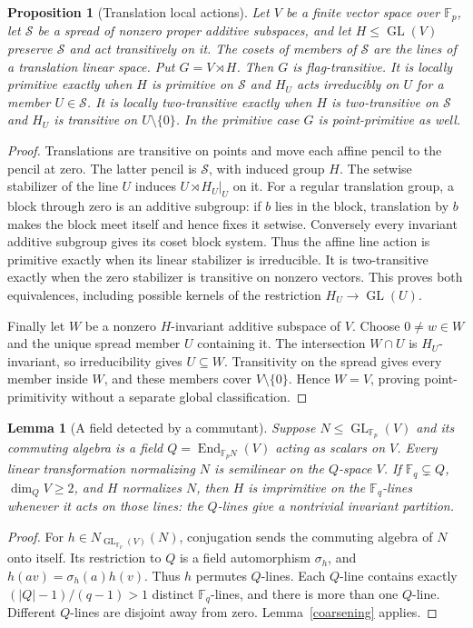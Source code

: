 \documentclass[11pt,a4paper]{article}
\newtheorem{lemma}[theorem]{Lemma}
\newtheorem{proposition}[theorem]{Proposition}
\newcommand{\F}{\mathbb F}
\newcommand{\GL}{\operatorname{GL}}
\newcommand{\End}{\operatorname{End}}
\begin{document}
\begin{proposition}[Translation local actions]\label{translation}
Let $V$ be a finite vector space over $\F_p$, let $\mathcal S$ be a spread
of nonzero proper additive subspaces, and let $H\leq\GL(V)$ preserve
$\mathcal S$ and act transitively on it. The cosets of members of
$\mathcal S$ are the lines of a translation linear space. Put $G=V\rtimes H$.
Then $G$ is flag-transitive. It is locally primitive exactly when $H$ is
primitive on $\mathcal S$ and $H_U$ acts irreducibly on $U$ for a member
$U\in\mathcal S$. It is locally two-transitive exactly when $H$ is
two-transitive on $\mathcal S$ and $H_U$ is transitive on $U\setminus\{0\}$.
In the primitive case $G$ is point-primitive as well.
\end{proposition}
\begin{proof}
Translations are transitive on points and move each affine pencil to the
pencil at zero. The latter pencil is $\mathcal S$, with induced group $H$.
The setwise stabilizer of the line $U$ induces $U\rtimes H_U|_U$ on it.
For a regular translation group, a block through zero is an additive
subgroup: if $b$ lies in the block, translation by $b$ makes the block
meet itself and hence fixes it setwise. Conversely every invariant additive
subgroup gives its coset block system. Thus the affine line action is
primitive exactly when its linear stabilizer is irreducible. It is
two-transitive exactly when the zero stabilizer is transitive on nonzero
vectors. This proves both equivalences, including possible kernels of the
restriction $H_U\to\GL(U)$.

Finally let $W$ be a nonzero $H$-invariant additive subspace of $V$.
Choose $0\ne w\in W$ and the unique spread member $U$ containing it.
The intersection $W\cap U$ is $H_U$-invariant, so irreducibility gives
$U\subseteq W$. Transitivity on the spread gives every member inside
$W$, and these members cover $V\setminus\{0\}$. Hence $W=V$, proving
point-primitivity without a separate global classification.
\end{proof}

\begin{lemma}[A field detected by a commutant]\label{field}
Suppose $N\leq\GL_{\F_p}(V)$ and its commuting algebra is a field
$Q=\End_{\F_pN}(V)$ acting as scalars on $V$. Every linear transformation
normalizing $N$ is semilinear on the $Q$-space $V$.
If $\F_q\subsetneq Q$, $\dim_Q V\geq2$, and $H$ normalizes $N$, then
$H$ is imprimitive on the $\F_q$-lines whenever it acts on those lines:
the $Q$-lines give a nontrivial invariant partition.
\end{lemma}
\begin{proof}
For $h\in N_{\GL_{\F_p}(V)}(N)$, conjugation sends the commuting algebra
of $N$ onto itself. Its restriction to $Q$ is a field automorphism
$\sigma_h$, and $h(av)=\sigma_h(a)h(v)$. Thus $h$ permutes $Q$-lines.
Each $Q$-line contains exactly $(|Q|-1)/(q-1)>1$ distinct $\F_q$-lines,
and there is more than one $Q$-line. Different $Q$-lines are disjoint away
from zero. Lemma~\ref{coarsening} applies.
\end{proof}
\end{document}
